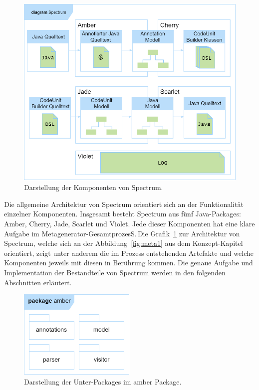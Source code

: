 \documentclass[12pt,oneside,a4paper,parskip]{scrbook}
\begin{document}
\begin{figure}[htbp]
\centering
\includegraphics[width=1.0\textwidth]{bilder/spectrumPackages}
\caption{Darstellung der Komponenten von Spectrum.}
\label{fig:spectrumPackages}
\end{figure}

Die allgemeine Architektur von Spectrum orientiert sich an der Funktionalität einzelner Komponenten. Insgesamt besteht Spectrum aus fünf Java-Packages: Amber, Cherry, Jade, Scarlet und Violet. Jede dieser Komponenten hat eine klare Aufgabe im Metagenerator-GesamtprozesS.\,Die Grafik~\ref{fig:spectrumPackages} zur Architektur von Spectrum, welche sich an der Abbildung~\ref{fig:meta1} aus dem Konzept-Kapitel orientiert, zeigt unter anderem die im Prozess entstehenden Artefakte und welche Komponenten jeweils mit diesen in Berührung kommen. Die genaue Aufgabe und Implementation der Bestandteile von Spectrum werden in den folgenden Abschnitten erläutert.

\begin{figure}[htbp]
\centering
\includegraphics[width=0.5\textwidth]{bilder/amber}
\caption{Darstellung der Unter-Packages im amber Package.}
\label{fig:amberPackages}
\end{figure}
\end{document}
